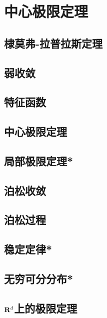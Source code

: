 \documentclass[main.tex]{subfiles}
\begin{document}
\chapter{中心极限定理}

\section{棣莫弗-拉普拉斯定理} \label{sec:3.1}
\section{弱收敛} \label{sec:3.2}
\section{特征函数} \label{sec:3.3}
\section{中心极限定理} \label{sec:3.4}
\section{局部极限定理*} \label{sec:3.5}
\section{泊松收敛} \label{sec:3.6}
\section{泊松过程} \label{sec:3.7}
\section{稳定定律*} \label{sec:3.8}
\section{无穷可分分布*} \label{sec:3.9}
\section{\texorpdfstring{\(\mathbf{R}^d\)}{R\^d}上的极限定理} \label{sec:3.10}
\end{document}
